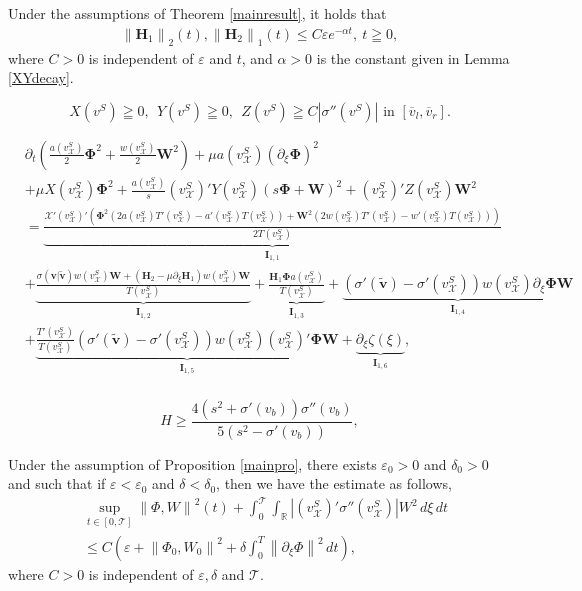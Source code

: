 \documentclass[10pt,a4paper]{amsart}
\def\R{\mathbb{R}}
\def\T{\mathcal{T}}
\def\X{\mathcal{X}}
\def\avl{\overline{v}_l}
\def\avr{\overline{v}_r}
\def\ph{\mathbf{\Phi}}
\def\p{\partial}
\def\vsx{v^S_{\mathcal{X}}}
\def\w{\mathbf{W}}
\newcommand{\norm}[1]{\left\lVert #1 \right\rVert}
\begin{document}
\begin{lemma}\label{decay-error}
	Under the assumptions of Theorem \ref{mainresult}, it holds that
	\begin{align*}
		\norm{\mathbf{H}_1}_2(t),\norm{\mathbf{H}_2}_1(t)\leq C\varepsilon e^{-\alpha t},~t\geqq 0,
	\end{align*}
	where $C>0$ is independent of $\varepsilon$ and $t$, and $\alpha>0$ is the constant given in Lemma \ref{XYdecay}.
\end{lemma}

  \begin{equation}\label{XYZ-cond}
  	X(v^S)\geqq 0, ~~Y(v^S)\geqq0,~~Z(v^S)\geqq C|\sigma''(v^S)|\text{ in }[\avl,\avr].
  \end{equation}

\begin{equation}\label{transe}
	\begin{aligned}
		&\p_t\left(\frac{a(\vsx)}{2}\ph^2+\frac{w(\vsx)}{2}\w^2\right)+\mu a(\vsx)(\p_{\xi}\ph)^2\\
		&+\mu X(\vsx)\ph^2+\frac{a(\vsx)}{s}(\vsx)'Y(\vsx)(s\ph+\w)^2+(\vsx)'Z(\vsx)\w^2\\
		&=\underbrace{\frac{\X'(\vsx)'(\ph^2(2a(\vsx)T'(\vsx)-a'(\vsx)T(\vsx))+\w^2(2w(\vsx)T'(\vsx)-w'(\vsx)T(\vsx)))}{2T(\vsx)}}_{\mathbf{I}_{1,1}}\\
		&+\underbrace{\frac{\sigma(\mathbf{v}|\mathbf{\tilde{v}})w(\vsx)\w+(\mathbf{H}_2-\mu\p_{\xi}\mathbf{H}_1)w(\vsx)\w}{T(\vsx)}}_{\mathbf{I}_{1,2}}+\underbrace{\frac{\mathbf{H}_1\ph a(\vsx)}{T(\vsx)}}_{\mathbf{I}_{1,3}}+\underbrace{(\sigma'(\mathbf{\tilde{v}})-\sigma'(\vsx))w(\vsx)\p_{\xi}\ph\w}_{\mathbf{I}_{1,4}}\\
		&+\underbrace{\frac{T'(\vsx)}{T(\vsx)}(\sigma'(\mathbf{\tilde{v}})-\sigma'(\vsx))w(\vsx)(\vsx)'\ph\w}_{\mathbf{I}_{1,5}}+\underbrace{\p_{\xi}\zeta(\xi)}_{\mathbf{I}_{1,6}},\\
	\end{aligned}
\end{equation}

\begin{equation}\label{Hbig}
	H\geq\frac{4(s^2+\sigma'(v_b))\sigma''(v_b)}{5(s^2-\sigma'(v_b))},
\end{equation}

\begin{lemma}\label{construction}
	Under the assumption of Proposition \ref{mainpro}, there exists $\varepsilon_0>0$ and $\delta_0>0$ and such that if $\varepsilon<\varepsilon_0$ and $\delta<\delta_0$, then we have the estimate as follows,
	\begin{equation}\label{transformestimate}
		\begin{aligned}
			&\mathop{sup}\limits_{t \in [0,\T]}\norm{\Phi,W}^2(t) +\int_{0}^{\T}\int_{\R} |(\vsx)'\sigma''(\vsx)|W^2\,d\xi \,dt\\
			&\leq C(\varepsilon+\norm{\Phi_0,W_0}^2+\delta\int_{0}^{T} \norm{\p_{\xi}\Phi}^2 \,dt ),
		\end{aligned}
	\end{equation}
	where $C>0$ is independent of $\varepsilon,\delta$ and $\T$.
\end{lemma}
\end{document}

